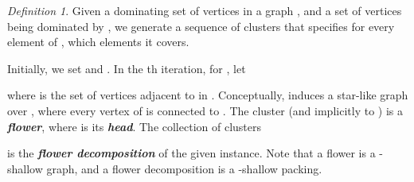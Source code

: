\documentclass[12pt]{article}
\newcommand{\emphic}[2]{\textcolor{blue25}{\textbf{\emph{#1}}}\index{#2}}
\renewcommand{\emphic}[2]{\textbf{\emph{#1}}}
\newcommand{\emphi}[1]{\emphic{#1}{#1}}
\theoremstyle{remark}\theoremheaderfont{\sf}\theorembodyfont{\upshape}
\newtheorem{defn}[theorem]{Definition}
\numberwithin{figure}{section}\numberwithin{table}{section}\numberwithin{equation}{section}
\providecommand{\deflab}[1]{\label{def:#1}}
\renewcommand{\th}{th\xspace}
\begin{document}
\begin{defn}
  \deflab{flower:head}Given a dominating set  of
  vertices in a graph , and a set of vertices
   being dominated by , we
  generate a sequence of clusters
   that
  specifies for every element of , which elements it covers.

  Initially, we set  and .
  In the \th iteration, for , let
  
  where  is the set of vertices adjacent to  in
  .  Conceptually,  induces a star-like graph
   over , where every vertex of  is
  connected to . The cluster  (and implicitly to
  ) is a \emphi{flower}, where  is its \emphi{head}.
  The collection of clusters
  
  is the \emphi{flower decomposition} of the given instance.  Note
  that a flower is a -shallow graph, and a flower decomposition is
  a -shallow packing.
\end{defn}
\end{document}
